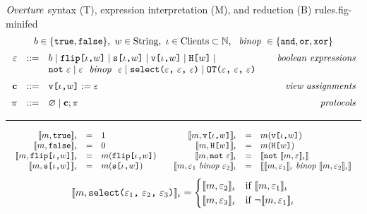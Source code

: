 \begin{fpfig}[t]{$\mathit{Overture}$ syntax (T), expression interpretation (M),  and reduction (B) rules.}{fig-minifed}
  {\small
    $$
    \begin{array}{rcl@{\hspace{8mm}}r}
      \multicolumn{4}{c}{b \in \{ \etrue, \efalse \},\  w \in \mathrm{String},\ \cid \in \mathrm{Clients} \subset  \mathbb{N},\ \bop \in \{ \eand, \eor, \exor \}} \\[2mm]
      \be &::=& b \mid \flip{\cid}{w} \mid \secret{\cid}{w} \mid \view{\cid}{w} \mid \oracle{w} \mid & \textit{boolean expressions}\\
      & &  \enot\ \be \mid \be\ \bop\ \be \mid \select{\be}{\be}{\be} \mid \OT{\be}{\be}{\be} \\[2mm]
      \instr &::=& \eassign{\view{\cid}{w}}{\be} & \textit{view assignments} \\[2mm]
      \prog &::=& \varnothing \mid \instr; \prog & \textit{protocols}
    \end{array}
    $$
  }

  \rule{130mm}{0.5pt}
  
  {\small
  $$
  \begin{array}{cc}
    \begin{array}{rcl}
      \llbracket m, \texttt{true} \rrbracket_{\iota} &=& 1\\
      \llbracket m, \texttt{false} \rrbracket_{\iota} &=& 0\\
      \llbracket m, \texttt{flip[}\iota\texttt{,}w\texttt{]} \rrbracket_{\iota} &=& m(\texttt{flip[}\iota\texttt{,}w\texttt{]})\\
      \llbracket m, \texttt{s[}\iota\texttt{,}w\texttt{]} \rrbracket_{\iota} &=& m(\texttt{s[}\iota\texttt{,}w\texttt{]})
    \end{array} & 
    \begin{array}{rcl}
      \llbracket m, \texttt{v[}\iota\texttt{,}w\texttt{]} \rrbracket_{\iota} &=& m(\texttt{v[}\iota\texttt{,}w\texttt{]})\\
      \llbracket m, \texttt{H[}w\texttt{]} \rrbracket_{\iota} &=& m(\texttt{H[}w\texttt{]})\\
      \llbracket m, \texttt{not}\ \varepsilon \rrbracket_{\iota} &=& \llbracket \texttt{not}\ \llbracket m,\varepsilon \rrbracket_{\iota} \rrbracket\\
      \llbracket m, \varepsilon_1\ \mathit{binop}\ \varepsilon_2 \rrbracket_{\iota} &=&
      \llbracket \llbracket m,\varepsilon_1 \rrbracket_{\iota}\ \mathit{binop}\ \llbracket m,\varepsilon_2 \rrbracket_{\iota} \rrbracket
    \end{array}
  \end{array}
  $$
  $$
  \lcod{\store, \select{\be_1}{\be_2}{\be_3}}{\cid} =
  \begin{cases}
    \lcod{\store,\be_2}{\cid} & \text{if\ } \lcod{\store,\be_1}{\cid}\\
    \lcod{\store,\be_3}{\cid} & \text{if\ } \neg\lcod{\store,\be_1}{\cid}
  \end{cases}%
  $$
  \vspace{1mm}
  
}
\end{fpfig}
